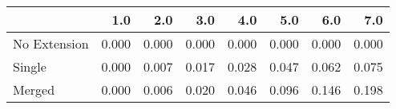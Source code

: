 \begin{tabular}{lrrrrrrr}
\toprule
{} &   1.0 &   2.0 &   3.0 &   4.0 &   5.0 &   6.0 &   7.0 \\
\midrule
No Extension & 0.000 & 0.000 & 0.000 & 0.000 & 0.000 & 0.000 & 0.000 \\
Single       & 0.000 & 0.007 & 0.017 & 0.028 & 0.047 & 0.062 & 0.075 \\
Merged       & 0.000 & 0.006 & 0.020 & 0.046 & 0.096 & 0.146 & 0.198 \\
\bottomrule
\end{tabular}
